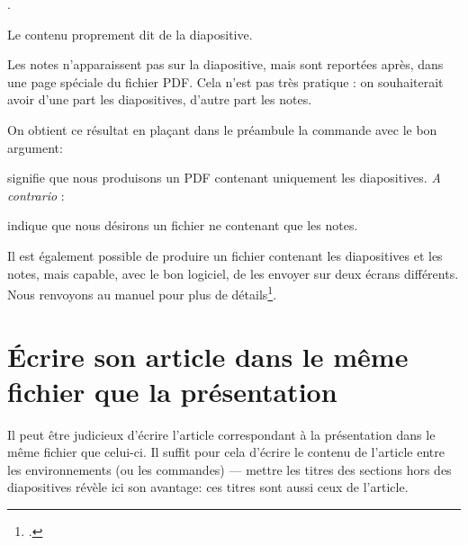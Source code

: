 \begin{latexcode}
\begin{frame}
.
    
Le contenu proprement dit de la diapositive.
\end{frame}
\end{latexcode}


Les notes n'apparaissent pas sur la diapositive, mais sont reportées après, dans une page spéciale du fichier PDF. Cela n'est pas très pratique : on souhaiterait avoir d'une part les diapositives, d'autre part les notes. 

On obtient ce résultat en plaçant dans le préambule la commande  avec le bon argument:

\begin{latexcode}
\end{latexcode}

signifie que nous produisons un PDF contenant uniquement les diapositives. \emph{A contrario} :

\begin{latexcode}
\end{latexcode}

indique que nous désirons un fichier ne contenant que les notes.

\begin{plusloins}
Il est également possible de produire un fichier contenant les diapositives et les notes, mais capable, avec le bon logiciel, de les envoyer sur deux écrans différents. Nous renvoyons au manuel pour plus de détails\footcite{beamer_2ecrans}.
\end{plusloins}

\section{Écrire son article dans le même fichier que la présentation}

Il peut être judicieux d'écrire l'article correspondant à la présentation dans le même fichier que celui-ci. Il suffit pour cela d'écrire le contenu de l'article entre les environnements (ou les commandes)  ---  mettre les titres des sections hors des diapositives révèle ici son avantage: ces titres sont aussi ceux de l'article.

